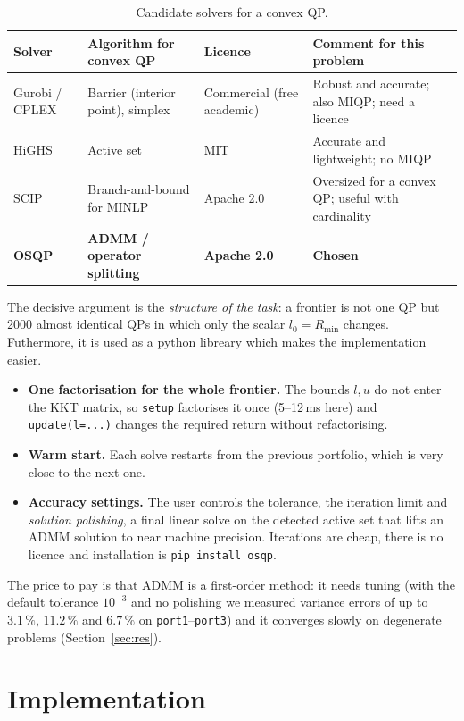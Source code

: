 \documentclass[10pt,a4paper]{article}
\begin{document}
\begin{table}[H]
\centering
\small
\caption{Candidate solvers for a convex QP.}
\label{tab:solvers}
\footnotesize
\begin{tabular}{@{}llll@{}}
\toprule
Solver & Algorithm for convex QP & Licence & Comment for this problem \\
\midrule
Gurobi / CPLEX & Barrier (interior point), simplex & Commercial (free academic) & Robust and accurate; also MIQP; need a licence \\
HiGHS & Active set & MIT & Accurate and lightweight; no MIQP \\
SCIP & Branch-and-bound for MINLP & Apache 2.0 & Oversized for a convex QP; useful with cardinality \\
\textbf{OSQP} & \textbf{ADMM / operator splitting} & \textbf{Apache 2.0} & \textbf{Chosen} \\
\bottomrule
\end{tabular}
\end{table}

The decisive argument is the \emph{structure of the task}: a frontier is not one QP but 2000 almost
identical QPs in which only the scalar $l_0=R_{\min}$ changes. Futhermore, it is used as a python libreary which makes the implementation easier.
\begin{itemize}
\item \textbf{One factorisation for the whole frontier.} The bounds $l,u$ do not enter the KKT matrix,
so \texttt{setup} factorises it once (5--12\,ms here) and \texttt{update(l=...)} changes the required
return without refactorising.
\item \textbf{Warm start.} Each solve restarts from the previous portfolio, which is very close to the
next one.
\item \textbf{Accuracy settings.} The user controls the tolerance, the iteration limit and
\emph{solution polishing}, a final linear solve on the detected active set that lifts an ADMM solution
to near machine precision. Iterations are cheap, there is no licence and installation is
\texttt{pip install osqp}.
\end{itemize}
The price to pay is that ADMM is a first-order method: it needs tuning (with the default tolerance
$10^{-3}$ and no polishing we measured variance errors of up to $3.1\,\%$, $11.2\,\%$ and $6.7\,\%$ on
\texttt{port1}--\texttt{port3}) and it converges slowly on degenerate problems (Section~\ref{sec:res}).

\section{Implementation}
\end{document}
